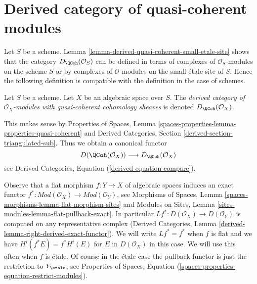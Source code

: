 \section{Derived category of quasi-coherent modules}
\label{section-derived-quasi-coherent}

\noindent
Let $S$ be a scheme. Lemma
\ref{lemma-derived-quasi-coherent-small-etale-site}
shows that the category $D_\QCoh(\mathcal{O}_S)$ can be defined
in terms of complexes of $\mathcal{O}_S$-modules on the scheme $S$
or by complexes of $\mathcal{O}$-modules on the small \'etale site
of $S$. Hence the following definition is compatible with the definition
in the case of schemes.

\begin{definition}
\label{definition-derived-quasi-coherent}
Let $S$ be a scheme. Let $X$ be an algebraic space over $S$.
The {\it derived category of $\mathcal{O}_X$-modules with
quasi-coherent cohomology sheaves} is denoted
$D_\QCoh(\mathcal{O}_X)$.
\end{definition}

\noindent
This makes sense by
Properties of Spaces, Lemma
\ref{spaces-properties-lemma-properties-quasi-coherent}
and
Derived Categories, Section \ref{derived-section-triangulated-sub}.
Thus we obtain a canonical functor
\begin{equation}
\label{equation-compare}
D(\QCoh(\mathcal{O}_X))
\longrightarrow
D_\QCoh(\mathcal{O}_X)
\end{equation}
see Derived Categories, Equation (\ref{derived-equation-compare}).

\medskip\noindent
Observe that a flat morphism $f : Y \to X$ of algebraic spaces
induces an exact functor
$f^* : \textit{Mod}(\mathcal{O}_X) \to \textit{Mod}(\mathcal{O}_Y)$,
see
Morphisms of Spaces, Lemma \ref{spaces-morphisms-lemma-flat-morphism-sites}
and
Modules on Sites, Lemma \ref{sites-modules-lemma-flat-pullback-exact}.
In particular $Lf^* : D(\mathcal{O}_X) \to D(\mathcal{O}_Y)$
is computed on any representative complex
(Derived Categories, Lemma \ref{derived-lemma-right-derived-exact-functor}).
We will write $Lf^* = f^*$ when $f$ is flat and we have
$H^i(f^*E) = f^*H^i(E)$ for $E$ in $D(\mathcal{O}_X)$ in this case.
We will use this often when $f$ is \'etale. Of course in the \'etale
case the pullback functor is just the restriction to $Y_\etale$,
see Properties of Spaces, Equation
(\ref{spaces-properties-equation-restrict-modules}).


